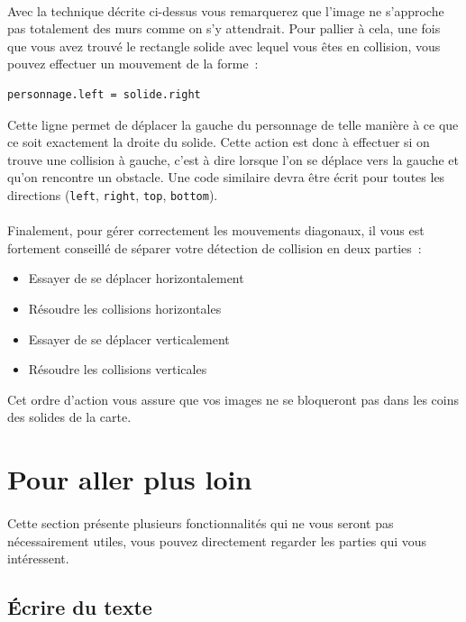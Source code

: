 \paragraph{}
Avec la technique décrite ci-dessus vous remarquerez que l'image ne s'approche pas totalement des murs comme on s'y attendrait.
Pour pallier à cela, une fois que vous avez trouvé le rectangle solide avec lequel vous êtes en collision, vous pouvez effectuer un mouvement de la forme~:
\begin{verbatim}
personnage.left = solide.right
\end{verbatim}
Cette ligne permet de déplacer la gauche du personnage de telle manière à ce que ce soit exactement la droite du solide.
Cette action est donc à effectuer si on trouve une collision à gauche, c'est à dire lorsque l'on se déplace vers la gauche et qu'on rencontre un obstacle.
Une code similaire devra être écrit pour toutes les directions (\texttt{left}, \texttt{right}, \texttt{top}, \texttt{bottom}).

\paragraph{}
Finalement, pour gérer correctement les mouvements diagonaux, il vous est fortement conseillé de séparer votre détection de collision en deux parties~:
\begin{itemize}
	\item Essayer de se déplacer horizontalement
	\item Résoudre les collisions horizontales
	\item Essayer de se déplacer verticalement
	\item Résoudre les collisions verticales
\end{itemize}
Cet ordre d'action vous assure que vos images ne se bloqueront pas dans les coins des solides de la carte.

\section{Pour aller plus loin}

\paragraph{}
Cette section présente plusieurs fonctionnalités qui ne vous seront pas nécessairement utiles, vous pouvez directement regarder les parties qui vous intéressent.

\subsection{Écrire du texte}
\label{sec:texte}

